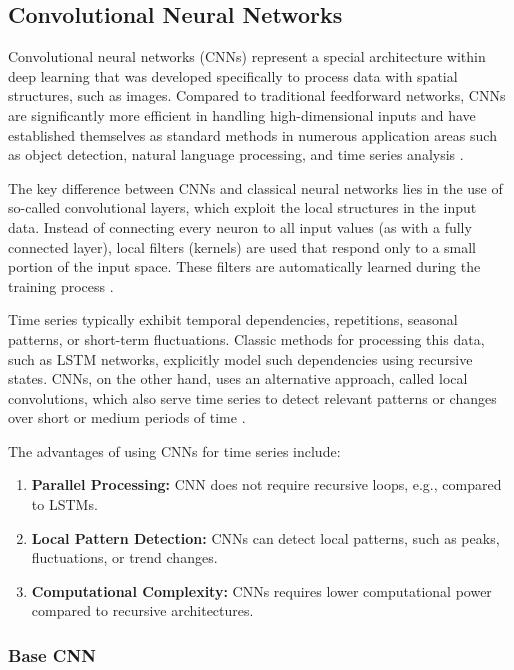 \subsection{Convolutional Neural Networks}
\label{chap:cnn}

Convolutional neural networks (CNNs) represent a special architecture within deep learning that was developed specifically to process data with spatial structures, such as images.
Compared to traditional feedforward networks, CNNs are significantly more efficient in handling high-dimensional inputs and have established themselves as standard methods in numerous application areas such as object detection, natural language processing, and time series analysis \cite{cnn-for-time-series}.

The key difference between CNNs and classical neural networks lies in the use of so-called convolutional layers, which exploit the local structures in the input data.
Instead of connecting every neuron to all input values (as with a fully connected layer), local filters (kernels) are used that respond only to a small portion of the input space.
These filters are automatically learned during the training process \cite{cnn-for-time-series}.

Time series typically exhibit temporal dependencies, repetitions, seasonal patterns, or short-term fluctuations.
Classic methods for processing this data, such as LSTM networks, explicitly model such dependencies using recursive states.
CNNs, on the other hand, uses an alternative approach, called local convolutions, which also serve time series to detect relevant patterns or changes over short or medium periods of time \cite{cnn-local-convolution}.

The advantages of using CNNs for time series include:

\begin{enumerate}
    \item \textbf{Parallel Processing:} CNN does not require recursive loops, e.g., compared to LSTMs.
    \item \textbf{Local Pattern Detection:} CNNs can detect local patterns, such as peaks, fluctuations, or trend changes.
    \item \textbf{Computational Complexity:} CNNs requires lower computational power compared to recursive architectures.
\end{enumerate}

\subsubsection{Base CNN}

